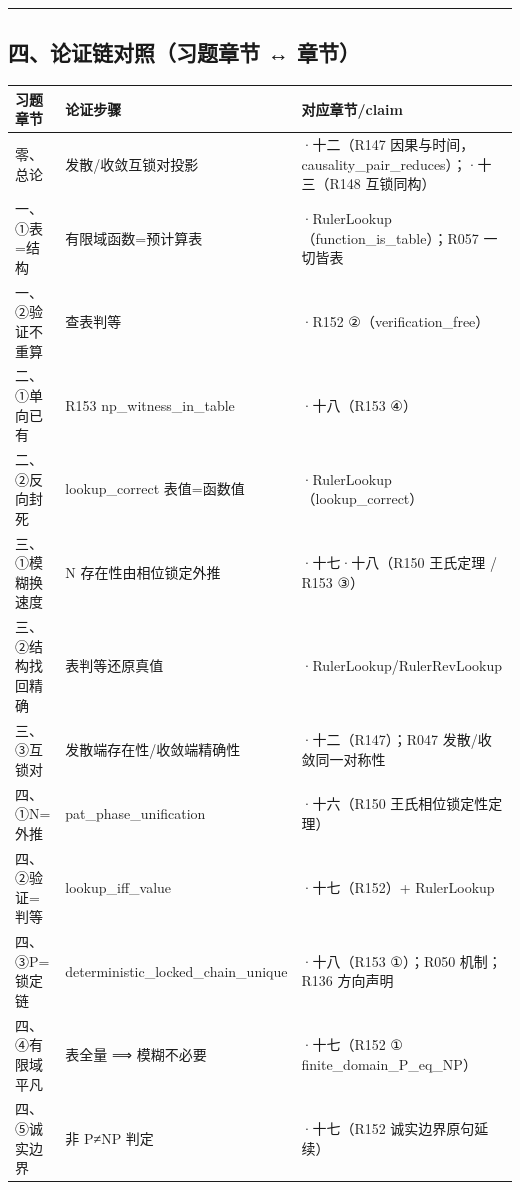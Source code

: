 \documentclass[
]{article}
\newcounter{none} %
\begin{document}
\begin{center}\rule{0.5\linewidth}{0.5pt}\end{center}

\subsection{四、论证链对照（习题章节 ↔
章节）}\label{ux56dbux8bbaux8bc1ux94feux5bf9ux7167ux4e60ux9898ux7ae0ux8282-ux7b51ux57faux7bc7ux7ae0ux8282}

{\def\LTcaptype{none} %
\begin{longtable}[]{@{}
 >{\raggedright\arraybackslash}p{}
 >{\raggedright\arraybackslash}p{}
 >{\raggedright\arraybackslash}p{}@{}}
\toprule\noalign{}
\begin{minipage}[b]{\linewidth}\raggedright
习题章节
\end{minipage} & \begin{minipage}[b]{\linewidth}\raggedright
论证步骤
\end{minipage} & \begin{minipage}[b]{\linewidth}\raggedright
对应章节/claim
\end{minipage} \\
\midrule\noalign{}
\endhead
\bottomrule\noalign{}
\endlastfoot
零、总论 & 发散/收敛互锁对投影 & ·十二（R147
因果与时间，causality\_pair\_reduces）；·十三（R148 互锁同构） \\
一、①表=结构 & 有限域函数=预计算表 &
·RulerLookup（function\_is\_table）；R057 一切皆表 \\
一、②验证不重算 & 查表判等 & ·R152 ②（verification\_free） \\
二、①单向已有 & R153 np\_witness\_in\_table & ·十八（R153 ④） \\
二、②反向封死 & lookup\_correct 表值=函数值 &
·RulerLookup（lookup\_correct） \\
三、①模糊换速度 & N 存在性由相位锁定外推 & ·十七·十八（R150
王氏定理 / R153 ③） \\
三、②结构找回精确 & 表判等还原真值 &
·RulerLookup/RulerRevLookup \\
三、③互锁对 & 发散端存在性/收敛端精确性 & ·十二（R147）；R047
发散/收敛同一对称性 \\
四、①N=外推 & pat\_phase\_unification & ·十六（R150
王氏相位锁定性定理） \\
四、②验证=判等 & lookup\_iff\_value & ·十七（R152）+
RulerLookup \\
四、③P=锁定链 & deterministic\_locked\_chain\_unique & ·十八（R153
①）；R050 机制；R136 方向声明 \\
四、④有限域平凡 & 表全量 ⟹ 模糊不必要 & ·十七（R152 ①
finite\_domain\_P\_eq\_NP） \\
四、⑤诚实边界 & 非 P≠NP 判定 & ·十七（R152 诚实边界原句延续） \\
\end{longtable}
}
\end{document}
